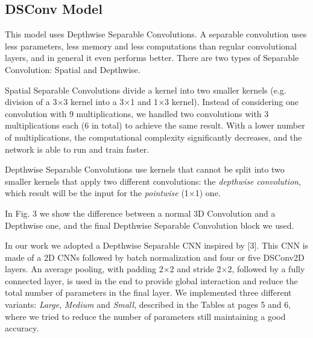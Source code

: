 \documentclass[conference]{IEEEtran}
\begin{document}
\subsection{DSConv Model}
This model uses Depthwise Separable Convolutions. A separable convolution uses less parameters, less memory and less computations than regular convolutional layers, and in general it even performs better.
There are two types of Separable Convolution: Spatial and Depthwise.

Spatial Separable Convolutions divide a kernel into two smaller kernels (e.g. division of a 3$\times$3 kernel into a 3$\times$1 and 1$\times$3 kernel). Instead of considering one convolution with 9 multiplications, we handled two convolutions with 3 multiplications each (6 in total) to achieve the same result. With a lower number of multiplications, the computational complexity significantly decreases, and the network is able to run and train faster.

Depthwise Separable Convolutions use kernels that cannot be split into two smaller kernels that apply two different convolutions: the \textit{depthwise convolution}, which result will be the input for the \textit{pointwise} (1$\times$1) one.

In Fig. 3 we show the difference between a normal 3D Convolution and a Depthwise one, and the final Depthwise Separable Convolution block we used. 

In our work we adopted a Depthwise Separable CNN inspired by [3]. This CNN is made of a 2D CNNs followed by batch normalization and four or five DSConv2D layers. An average pooling, with padding 2$\times$2 and stride 2$\times$2, followed by a fully connected layer, is used in the end to provide global interaction and reduce the total number of parameters in the final layer.
We implemented three different variants: \textit{Large}, \textit{Medium} and \textit{Small}, described in the Tables at pages 5 and 6, where we tried to reduce the number of parameters still maintaining a good accuracy.
\end{document}
